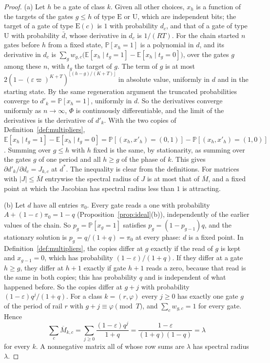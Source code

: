 \documentclass[11pt]{amsart}
\theoremstyle{definition}
\theoremstyle{remark}
\newcommand{\eps}{\varepsilon}
\newcommand{\PP}{\mathbb{P}}
\newcommand{\EE}{\mathbb{E}}
\begin{document}
\begin{proof}
(a) Let $h$ be a gate of class $k$. Given all other choices, $x_h$ is a function of the targets of
the gates $g\le h$ of type $\mathrm E$ or $\mathrm U$, which are independent bits; the target of a
gate of type $\mathrm E(c)$ is $1$ with probability $d_c$, and that of a gate of type $\mathrm U$
with probability $\bar d$, whose derivative in $d_c$ is $1/(RT)$. For the chain started $n$ gates
before $h$ from a fixed state, $\PP[x_h=1]$ is a polynomial in $d$, and its derivative in $d_c$
is $\sum_gw_{g,c}\bigl(\EE[x_h\mid t_g=1]-\EE[x_h\mid t_g=0]\bigr)$, over the gates $g$ among
these $n$, with $t_g$ the target of $g$. The term of $g$ is at most
$2(1-(\eps\varpi)^{K+T})^{\lfloor(h-g)/(K+T)\rfloor}$ in absolute value, uniformly in $d$ and in
the starting state. By the same regeneration argument the truncated probabilities converge to
$d'_k=\PP[x_h=1]$, uniformly in $d$. So the derivatives converge uniformly as $n\to\infty$, $\Phi$
is continuously differentiable, and the limit of the derivatives is the derivative of $d'_k$. With the two copies of Definition~\ref{def:multipliers},
$\EE[x_h\mid t_g=1]-\EE[x_h\mid t_g=0]=\PP[(x_h,x'_h)=(0,1)]-\PP[(x_h,x'_h)=(1,0)]$. Summing over
$g\le h$ with $h$ fixed is the same, by stationarity, as summing over the gates $g$ of one period
and all $h\ge g$ of the phase of $k$. This gives $\partial d'_k/\partial d_c=J_{k,c}$ at $d^*$. The
inequality is clear from the definitions. For matrices with $|J|\le\overline M$ entrywise the
spectral radius of $J$ is at most that of $\overline M$, and a fixed point at which the Jacobian
has spectral radius less than $1$ is attracting.

(b) Let $d$ have all entries $\pi_0$. Every gate reads a one with probability
$A+(1-\eps)\pi_0=1-q$ (Proposition~\ref{prop:ideal}(b)), independently of the earlier values of
the chain. So $p_g=\PP[x_g=1]$ satisfies $p_g=(1-p_{g-1})q$, and the stationary solution is
$p_g=q/(1+q)=\pi_0$ at every phase: $d$ is a fixed point. In Definition~\ref{def:multipliers},
the copies differ at $g$ exactly if the read of $g$ is kept and $x_{g-1}=0$, which has probability
$(1-\eps)/(1+q)$. If they differ at a gate $h\ge g$, they differ at $h+1$ exactly if gate $h+1$
reads a zero, because that read is the same in both copies; this has probability $q$ and is
independent of what happened before. So the copies differ at $g+j$ with probability
$(1-\eps)q^j/(1+q)$. For a class $k=(r,\varphi)$ every $j\ge0$ has exactly one gate $g$ of the period of
rail $r$ with $g+j\equiv \varphi\pmod T$, and $\sum_cw_{g,c}=1$ for every gate. Hence
\[
\sum_c\overline M_{k,c}=\sum_{j\ge0}\frac{(1-\eps)q^j}{1+q}=\frac{1-\eps}{(1+q)(1-q)}=\lambda
\]
for every $k$. A nonnegative matrix all of whose row sums are $\lambda$ has spectral radius
$\lambda$.


\end{proof}
\end{document}
